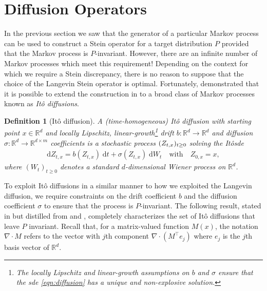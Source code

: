 \documentclass[12pt,paper=letter]{scrreprt}
\newtheorem{definition}{Definition}[chapter]
\newcommand{\qtext}[1]{\quad\text{#1}\quad}
\def\Ito{It\^o\xspace}
\def\reals{\mathbb{R}} %
\newcommand{\pvar}[0]{z}%
\newcommand{\PVAR}[0]{\MakeUppercase{\pvar}} %
\newcommand{\process}[2]{\PVAR_{#1,#2}} %
\begin{document}
\section{Diffusion Operators}
\label{sec: diffusion operators}

In the previous section we saw that the generator of a particular Markov process can be used to construct a Stein operator for a target distribution $P$ provided that the Markov process is $P$-invariant.
However, there are an infinite number of Markov processes which meet this requirement!
Depending on the context for which we require a Stein discrepancy, there is no reason to suppose that the choice of the Langevin Stein operator is optimal.
Fortunately, \citet{Gorham2019} demonstrated that it is possible to extend the construction in  to a broad class of Markov processes known as \emph{\Ito diffusions}. 

\begin{definition}[\Ito diffusion]
\label{def:diffusion}
A (time-homogeneous) \emph{\Ito diffusion} 
with starting point $x\in\reals^d$ and 
locally Lipschitz, linear-growth\footnote{The locally Lipschitz and linear-growth assumptions on $b$ and $\sigma$ ensure that the \ac{sde} \cref{eqn:diffusion} has a unique \citep[][Chap.~IV, Thm.~3.1]{ikeda2014stochastic} and non-explosive \citep[][Thm.~5.2.1]{oksendal2013stochastic}  solution.} \emph{drift} $b : \reals^d \to \reals^d$ and 
\emph{diffusion} $\sigma : \reals^d \to \reals^{d\times m}$ \emph{coefficients }
is a stochastic process $(\process{t}{x})_{t\geq0}$ solving the \Ito \ac{sde}
\begin{align}\label{eqn:diffusion}
\mathrm{d}Z_{t,x} = b(Z_{t,x}) \; \mathrm{d}t + \sigma(Z_{t,x}) \; \mathrm{d}W_t \qtext{with} Z_{0,x} = x, 
\end{align}
where $(W_t)_{t \geq 0}$ denotes a standard $d$-dimensional Wiener process on $\reals^d$.
\end{definition}

To exploit \Ito diffusions in a similar manner to how we exploited the Langevin diffusion, we require constraints on the drift coefficient $b$ and the diffusion coefficient $\sigma$ to ensure that the process is $P$-invariant.
The following result, stated in \citet[][Theorem 2]{Gorham2019} but distilled from \citet[][Theorem 2]{ma2015complete} and \citet[][Section 4.6]{pavliotis2016stochastic}, completely characterizes the set of \Ito diffusions that leave $P$ invariant.
Recall that, for a matrix-valued function $M(x)$, the notation $\nabla \cdot M$ refers to the vector with $j$th component $\nabla \cdot (M^\top e_j)$ where $e_j$ is the $j$th basis vector of $\mathbb{R}^d$.
\end{document}
